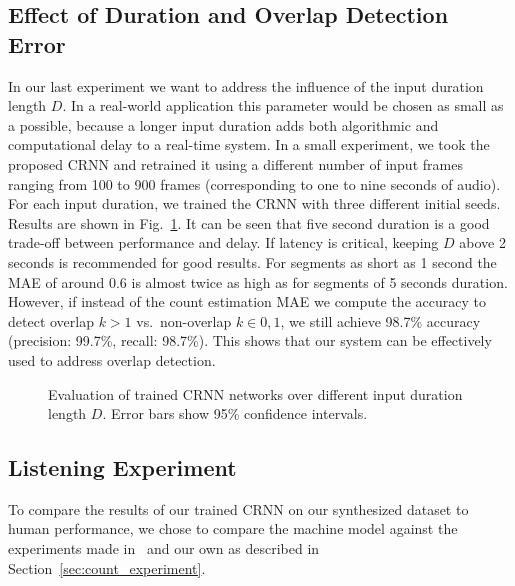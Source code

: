 \subsection{Effect of Duration and Overlap Detection Error}%
\label{ssec:exp_duration}
In our last experiment we want to address the influence of the input duration length \(D\).
In a real-world application this parameter would be chosen as small as a possible, because a longer input duration adds both algorithmic and computational delay to a real-time system.
In a small experiment, we took the proposed CRNN and retrained it using a different number of input frames ranging from 100 to 900 frames (corresponding to one to nine seconds of audio).
For each input duration, we trained the CRNN with three different initial seeds.
Results are shown in Fig.~\ref{fig:timesteps}.
It can be seen that five second duration is a good trade-off between performance and delay.
If latency is critical, keeping \(D\) above 2 seconds is recommended for good results.
For segments as short as 1 second the MAE of around 0.6 is almost twice as high as for segments of 5 seconds duration.
However, if instead of the count estimation MAE we compute the accuracy to detect overlap \(k > 1\) vs.\ non-overlap \(k \in {0, 1}\), we still achieve 98.7\% accuracy (precision: 99.7\%, recall: 98.7\%). This shows that our system can be effectively used to address overlap detection.

\begin{figure}[h!]
   \centering
   \centering
   \begin{adjustbox}{width=0.8\columnwidth}
     
   \end{adjustbox}
   \caption{Evaluation of trained CRNN networks over different input duration length \(D\). Error bars show 95\% confidence intervals.}%
   \label{fig:timesteps}
\end{figure}

\vspace*{-0.25cm}%
\subsection{Listening Experiment}%
\label{ssec:listening_experiment}
To compare the results of our trained CRNN on our synthesized dataset to human performance, we chose to compare the machine model against the experiments made in~\cite{kawashima15, kashino96} and our own as described in Section~\ref{sec:count_experiment}.

